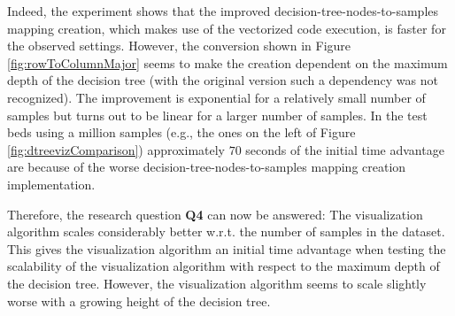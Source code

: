 Indeed, the experiment shows that the improved decision-tree-nodes-to-samples mapping creation, which makes use of the vectorized code execution, is faster for the observed settings. However, the conversion shown in Figure \ref{fig:rowToColumnMajor} seems to make the creation dependent on the maximum depth of the decision tree (with the original version such a dependency was not recognized). The improvement is exponential for a relatively small number of samples but turns out to be linear for a larger number of samples. In the test beds using a million samples (e.g., the ones on the left of Figure \ref{fig:dtreevizComparison}) approximately $70$ seconds of the initial time advantage are because of the worse decision-tree-nodes-to-samples mapping creation implementation.

Therefore, the research question \textbf{Q4} can now be answered: The visualization algorithm scales considerably better w.r.t. the number of samples in the dataset. This gives the visualization algorithm an initial time advantage when testing the scalability of the visualization algorithm with respect to the maximum depth of the decision tree. However, the visualization algorithm seems to scale slightly worse with a growing height of the decision tree. 